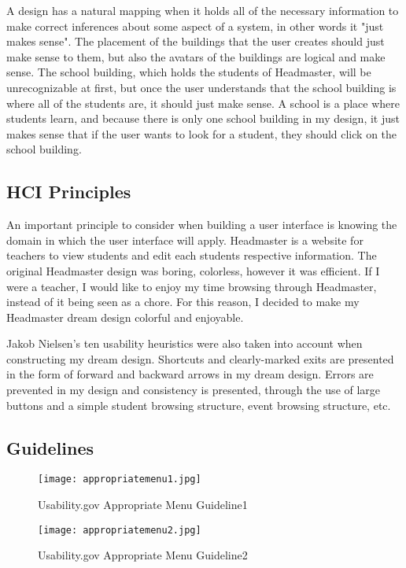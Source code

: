 \documentclass[11pt]{article}
\begin{document}
A design has a natural mapping when it holds all of the necessary information to make correct inferences about some aspect of a system, in other words it "just makes sense". The placement of the buildings that the user creates should just make sense to them, but also the avatars of the buildings are logical and make sense. The school building, which holds the students of Headmaster, will be unrecognizable at first, but once the user understands that the school building is where all of the students are, it should just make sense. A school is a place where students learn, and because there is only one school building in my design, it just makes sense that if the user wants to look for a student, they should click on the school building. 

\subsection{HCI Principles}
An important principle to consider when building a user interface is knowing the domain in which the user interface will apply. Headmaster is a website for teachers to view students and edit each students respective information. The original Headmaster design was boring, colorless, however it was efficient. If I were a teacher, I would like to enjoy my time browsing through Headmaster, instead of it being seen as a chore. For this reason, I decided to make my Headmaster dream design colorful and enjoyable. 

Jakob Nielsen's ten usability heuristics were also taken into account when constructing my dream design. Shortcuts and clearly-marked exits are presented in the form of forward and backward arrows in my dream design. Errors are prevented in my design and consistency is presented, through the use of large buttons and a simple student browsing structure, event browsing structure, etc.

\subsection{Guidelines}
\begin{figure}[h]
\centering
\texttt{[image: appropriatemenu1.jpg]}
\caption{Usability.gov Appropriate Menu Guideline1}
\label{menu1}
\end{figure}

\begin{figure}[h]
\centering
\texttt{[image: appropriatemenu2.jpg]}
\caption{Usability.gov Appropriate Menu Guideline2}
\label{menu2}
\end{figure}
\end{document}
